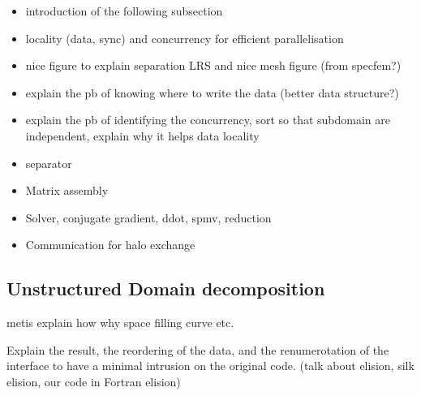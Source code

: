 \documentclass{IOS-Book-Article}
\begin{document}
\begin{itemize}
 \item introduction of the following subsection
 \item locality (data, sync) and concurrency for efficient parallelisation
 \item nice figure to explain separation LRS and nice mesh figure (from specfem?)
 \item explain the pb of knowing where to write the data (better data structure?)
 \item explain the pb of identifying the concurrency, sort so that subdomain are independent, explain why it helps data locality
 \item separator
 \item Matrix assembly
 \item Solver, conjugate gradient, ddot, spmv, reduction
 \item Communication for halo exchange
\end{itemize}


\subsection{Unstructured Domain decomposition}

metis explain how why space filling curve etc.

Explain the result, the reordering of the data, and the renumerotation of the interface to have a minimal intrusion on the original code.
(talk about elision, silk elision, our code in Fortran elision)
\end{document}
